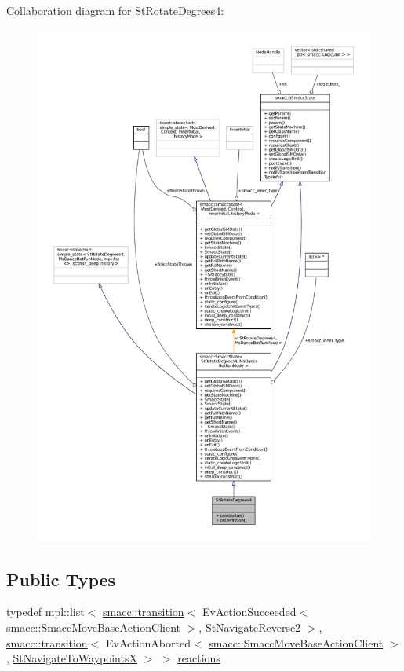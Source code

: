 Collaboration diagram for St\+Rotate\+Degrees4\+:
\nopagebreak
\begin{figure}[H]
\begin{center}
\leavevmode
\includegraphics[width=350pt]{structStRotateDegrees4__coll__graph}
\end{center}
\end{figure}
\subsection*{Public Types}
\begin{DoxyCompactItemize}
\item 
typedef mpl\+::list$<$ \hyperlink{classsmacc_1_1transition}{smacc\+::transition}$<$ Ev\+Action\+Succeeded$<$ \hyperlink{classsmacc_1_1SmaccMoveBaseActionClient}{smacc\+::\+Smacc\+Move\+Base\+Action\+Client} $>$, \hyperlink{structStNavigateReverse2}{St\+Navigate\+Reverse2} $>$, \hyperlink{classsmacc_1_1transition}{smacc\+::transition}$<$ Ev\+Action\+Aborted$<$ \hyperlink{classsmacc_1_1SmaccMoveBaseActionClient}{smacc\+::\+Smacc\+Move\+Base\+Action\+Client} $>$, \hyperlink{structStNavigateToWaypointsX}{St\+Navigate\+To\+WaypointsX} $>$ $>$ \hyperlink{structStRotateDegrees4_a810ef3b1574c44f31fa9b848c248dce0}{reactions}
\end{DoxyCompactItemize}
